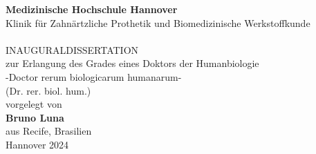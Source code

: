 
% 
\begin{titlepage}
 	\sffamily\huge
 	\centering
 	\textbf{Medizinische Hochschule Hannover}
 	\vspace{3\baselineskip}\\
 	\large
 	Klinik für Zahnärtzliche Prothetik und Biomedizinische Werkstoffkunde
 	\vspace{3\baselineskip}\\
 	\huge
 	\textbf{\dissTitle}
 	\vspace{3\baselineskip}\\
	\large
 	INAUGURALDISSERTATION \\
 	zur Erlangung des Grades eines Doktors der Humanbiologie \\
 	-Doctor rerum biologicarum humanarum- \\
 	(Dr. rer. biol. hum.)
 	\vspace{4\baselineskip}\\
 	vorgelegt von
 	\vspace{2\baselineskip}\\
 	\Large
 	\textbf{Bruno Luna}
 	\vspace{2\baselineskip}\\
 	aus Recife, Brasilien
 	\vspace{3\baselineskip}\\
 	Hannover 2024
\end{titlepage}
